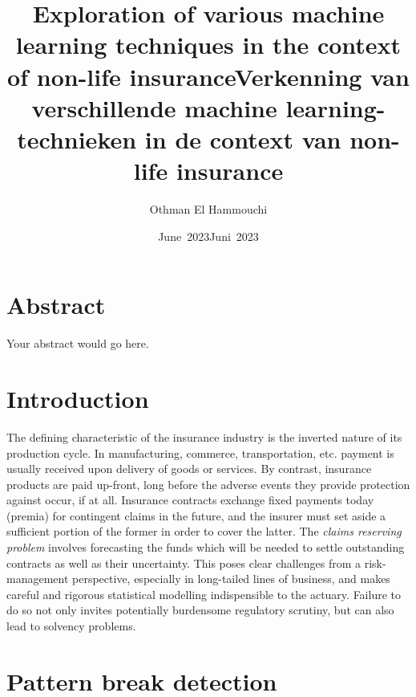 \documentclass[a4paper]{book}
\title{Exploration of various machine learning techniques in the context of non-life insurance}
\author{Othman El Hammouchi}
\date{June~2023}
\theoremstyle{plain}
\begin{document}
\frontmatter
\maketitle%


\title{Verkenning van verschillende machine learning-technieken in de context van non-life insurance}
%
\date{Juni~2023}%
%
\maketitle%

\chapter{Abstract}

Your abstract would go here.

\tableofcontents%

\mainmatter%

\chapter{Introduction}

The defining characteristic of the insurance industry is the inverted nature of its production cycle. In manufacturing, commerce, transportation, etc. payment is usually received upon delivery of goods or services. By contrast, insurance products are paid up-front, long before the adverse events they provide protection against occur, if at all. Insurance contracts exchange fixed payments today (premia) for contingent claims in the future, and the insurer must set aside a sufficient portion of the former in order to cover the latter. The \emph{claims reserving problem} involves forecasting the funds which will be needed to settle outstanding contracts as well as their uncertainty. This poses clear challenges from a risk-management perspective, especially in long-tailed lines of business, and makes careful and rigorous statistical modelling indispensible to the actuary. Failure to do so not only invites potentially burdensome regulatory scrutiny, but can also lead to solvency problems.

\chapter{Pattern break detection}%
\end{document}

